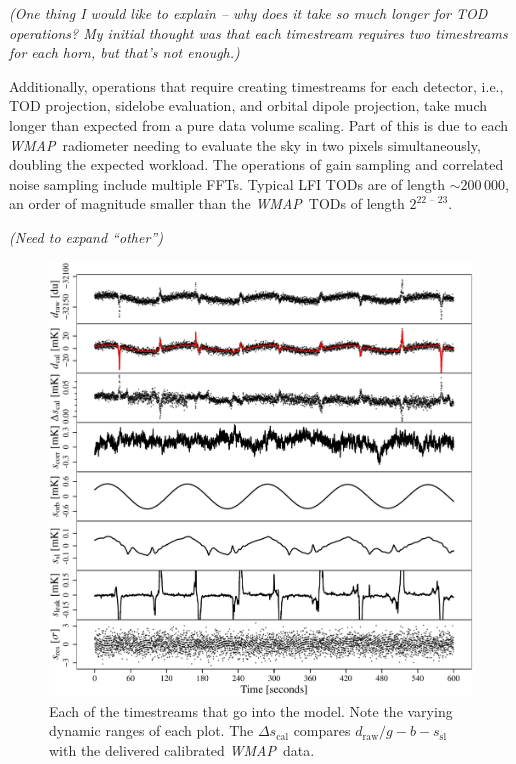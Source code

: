 \documentclass[twocolumn]{../../common/aa}
\def\WMAP{\emph{WMAP}}
\begin{document}
\textit{(One thing I would like to explain -- why does it take so much longer for TOD operations? My initial thought was that each timestream requires two timestreams for each horn, but that's not enough.)}

Additionally, operations that require creating timestreams for each detector, i.e., TOD projection, sidelobe evaluation, and orbital dipole projection, take much longer than expected from a pure data volume scaling. Part of this is due to each \WMAP\ radiometer needing to evaluate the sky in two pixels simultaneously, doubling the expected workload. The operations of gain sampling and correlated noise sampling include multiple FFTs. Typical LFI TODs are of length $\sim200\,000$, an order of magnitude smaller than the \WMAP\ TODs of length $2^{\text{22\ --\ 23}}$. 

\textit{(Need to expand ``other'')}


\begin{figure}
	\includegraphics[width=\textwidth]{figures/K113_timestreams.pdf}
	\caption{Each of the timestreams that go into the model. Note the varying dynamic ranges of each plot.
	The $\Delta s_\mathrm{cal}$ compares $d_\mathrm{raw}/g-b-s_\mathrm{sl}$ with the delivered calibrated \WMAP\ data.}
\end{figure}
\end{document}
